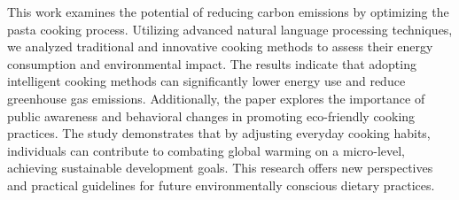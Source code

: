 This work examines the potential of reducing carbon emissions by optimizing the pasta cooking process. Utilizing advanced natural language processing techniques, we analyzed traditional and innovative cooking methods to assess their energy consumption and environmental impact. The results indicate that adopting intelligent cooking methods can significantly lower energy use and reduce greenhouse gas emissions. Additionally, the paper explores the importance of public awareness and behavioral changes in promoting eco-friendly cooking practices. The study demonstrates that by adjusting everyday cooking habits, individuals can contribute to combating global warming on a micro-level, achieving sustainable development goals. This research offers new perspectives and practical guidelines for future environmentally conscious dietary practices.
